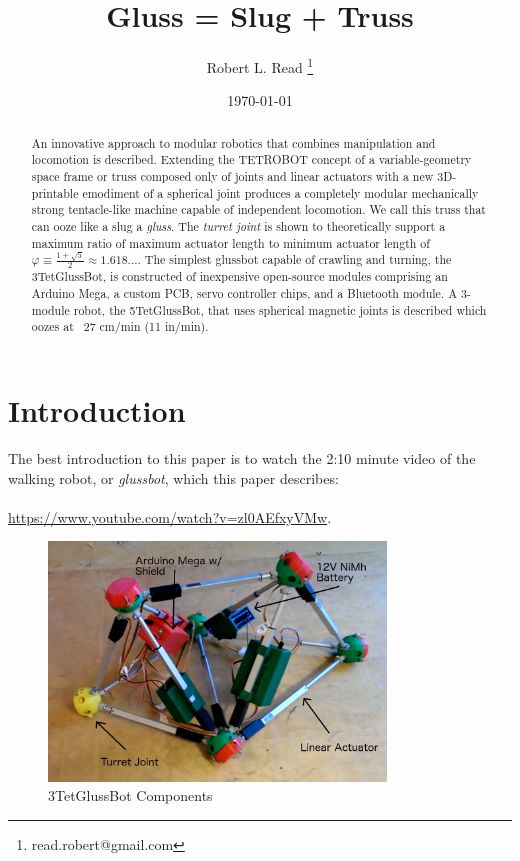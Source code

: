 \documentclass[11pt]{article}
\title{Gluss = Slug + Truss}
\author{Robert L. Read
  \thanks{read.robert@gmail.com}
}
\affil{Founder, Public Invention, an educational non-profit.}
\date{\today}
\begin{document}
\maketitle


\begin{abstract}
  An innovative approach to modular robotics that combines manipulation and locomotion is described.
  Extending the TETROBOT\cite{sanderson1996modular,lee2002dynamic,lee1999dynamics} concept of a variable-geometry
  space frame or truss composed only of joints and linear actuators with a new 3D-printable emodiment of a
  spherical joint\cite{song2003spherical}
  produces a completely modular mechanically strong tentacle-like machine capable of independent locomotion.
  We call this truss that can ooze like a slug a \emph{gluss}.
  The \emph{turret joint} is shown to theoretically support a maximum ratio of maximum actuator length to
  minimum actuator length of  $\varphi \equiv \frac{1 + \sqrt{5}}{2} \approx 1.618...$.
  The simplest glussbot capable of crawling and turning, the 3TetGlussBot, is constructed of
  inexpensive open-source modules comprising an Arduino Mega, a custom PCB, servo controller chips, and a Bluetooth module.
  A 3-module robot, the 5TetGlussBot, that uses spherical magnetic joints is described which oozes at ~27 cm/min (11 in/min).
\end{abstract}


\section{Introduction}

The best introduction to this paper is to watch the 2:10 minute video of the
walking robot, or \emph{glussbot}, which this paper describes:\\
\\
\indent \href{https://www.youtube.com/watch?v=zl0AEfxyVMw}{https://www.youtube.com/watch?v=zl0AEfxyVMw}.\\

\begin{figure}[H]
  \centering
    \includegraphics[width=0.8\textwidth]{figures/3TetGlussBotPhotoAnnotated.png}
    \caption[3TetGlussBot Components]{3TetGlussBot Components}
      \label{annotated}
\end{figure}
\end{document}
